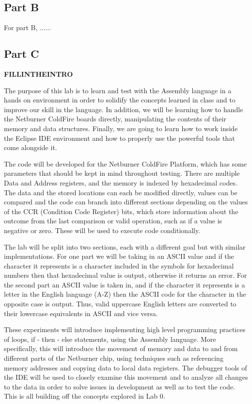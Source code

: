 \documentclass[letterpaper]{article}
\begin{document}
  \subsection{Part B}
  For part B, ......
  \subsection{Part C}
  \textbf{FILLINTHEINTRO}
  
  The purpose of this lab is to learn and test with the Assembly language in a hands on environment
  in order to solidify the concepts learned in class and to improve our skill in the language.  In
  addition, we will be learning how to handle the Netburner ColdFire boards directly, manipulating
  the contents of their memory and data structures.  Finally, we are going to learn how to work inside
  the Eclipse IDE environment and how to properly use the powerful tools that come alongside it.



  The code will be developed for the Netburner ColdFire Platform, which has some parameters that should
  be kept in mind throughout testing.  There are multiple Data and Address registers, and the memory
  is indexed by hexadecimal codes.  The data and the stored locations can each be modified directly, values
  can be compared and the code can branch into different sections depending on the values of the CCR
  (Condition Code Register) bits,
  which store information about the outcome from the last comparison or valid operation, such as if a
  value is negative or zero.  These will be used to execute code conditionally.

  The lab will be split into two sections, each with a different goal but with similar implementations.
  For one part we will be taking in an ASCII value and if the character it represents is a character
  included in the symbols for hexadecimal numbers then that hexadecimal value is output, otherwise
  it returns an error.  For the second part an ASCII value is taken in, and if the character it represents
  is a letter in the English language (A-Z) then the ASCII code for the character in the opposite case
  is output.  Thus, valid uppercase English letters are converted to their lowercase equivalents in ASCII
  and vice versa.


  These experiments will introduce implementing high level programming practices of loops, if - then - else statements,
  using the Assembly language. More specifically, this will introduce the movement of
  memory and data to and from different parts of the Netburner chip, using techniques such as referencing
  memory addresses and copying data to local data registers.  The debugger tools of the IDE will be used
  to closely examine this movement and to analyze all changes to the data in order to solve issues in
  development as well as to test the code.  This is all building off the concepts explored in Lab 0.
\end{document}
